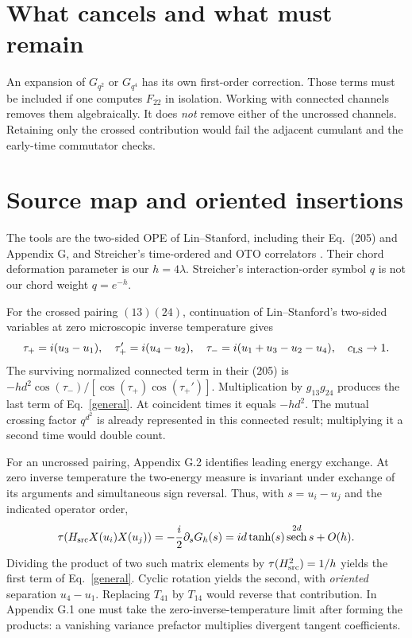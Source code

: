 \documentclass[11pt,a4paper]{article}
\DeclareMathOperator{\sech}{sech}
\begin{document}
\section{What cancels and what must remain}
An expansion of $G_{q^2}$ or $G_{q^4}$ has its own first-order correction.
Those terms must be included if one computes $F_{22}$ in isolation.
Working with connected channels removes them algebraically. It does
\emph{not} remove either of the uncrossed channels. Retaining only the
crossed contribution would fail the adjacent cumulant and the early-time
commutator checks.

\newpage
\section{Source map and oriented insertions}
The tools are the two-sided OPE of Lin--Stanford, including their
Eq.~(205) and Appendix G, and Streicher's time-ordered and OTO correlators
\cite{lin,streicher}. Their chord deformation parameter is our $h=4\lambda$.
Streicher's interaction-order symbol $q$ is not our chord weight $q=e^{-h}$.

For the crossed pairing $(13)(24)$, continuation of Lin--Stanford's
two-sided variables at zero microscopic inverse temperature gives
\begin{equation}
 \tau_+=i(u_3-u_1),\quad \tau_+'=i(u_4-u_2),\quad
 \tau_-=i(u_1+u_3-u_2-u_4),\quad c_{\rm LS}\to1.
\end{equation}
The surviving normalized connected term in their (205) is
$-hd^2\cos(\tau_-)/[\cos(\tau_+)\cos(\tau_+')]$.
Multiplication by $g_{13}g_{24}$ produces the last term of
Eq.~\eqref{general}. At coincident times it equals $-hd^2$.
The mutual crossing factor $q^{d^2}$ is already represented in this
connected result; multiplying it a second time would double count.

For an uncrossed pairing, Appendix G.2 identifies leading energy exchange.
At zero inverse temperature the two-energy measure is invariant under
exchange of its arguments and simultaneous sign reversal. Thus, with
$s=u_i-u_j$ and the indicated operator order,
\begin{equation}
 \tau(H_{\rm src}X(u_i)X(u_j))
 =-\frac{i}{2}\partial_sG_h(s)
 =id\tanh(s)\sech^{2d}s+O(h).
\end{equation}
Dividing the product of two such matrix elements by
$\tau(H_{\rm src}^2)=1/h$ yields the first term of
Eq.~\eqref{general}. Cyclic rotation yields the second, with
\emph{oriented} separation $u_4-u_1$. Replacing $T_{41}$ by $T_{14}$
would reverse that contribution. In Appendix G.1 one must take the
zero-inverse-temperature limit after forming the products: a vanishing
variance prefactor multiplies divergent tangent coefficients.
\end{document}
